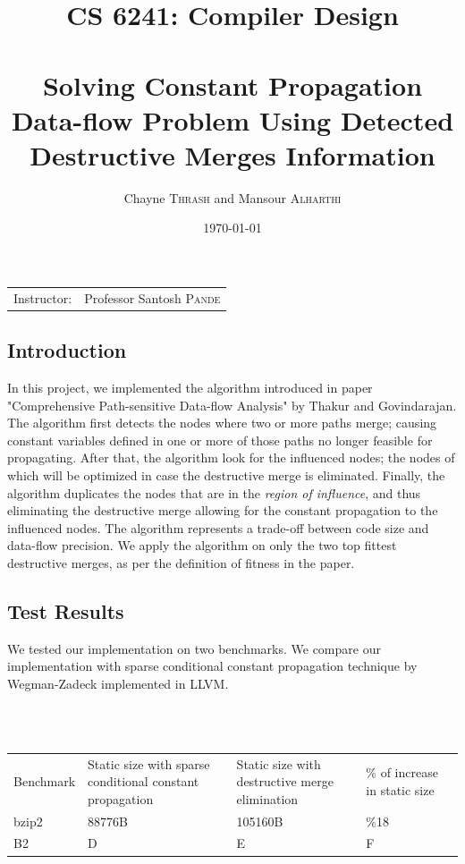\documentclass{article}
\title{CS 6241: Compiler Design \\~\\ Solving Constant Propagation Data-flow Problem Using Detected Destructive Merges Information} %
\author{Chayne \textsc{Thrash} and Mansour \textsc{Alharthi}} %
\date{\today} %
\begin{document}
\maketitle %

\begin{center}
\begin{tabular}{l r}
Instructor: & Professor Santosh \textsc{Pande} %
\end{tabular}
\end{center}

\subsection{Introduction}
In this project, we implemented the algorithm introduced in paper "Comprehensive Path-sensitive Data-flow Analysis" by Thakur and Govindarajan. The algorithm first detects the nodes where two or more paths merge; causing constant variables defined in one or more of those paths no longer feasible for propagating. After that, the algorithm look for the influenced nodes; the nodes of which will be optimized in case the destructive merge is eliminated. Finally, the algorithm duplicates the nodes that are in the \textit{region of influence}, and thus eliminating the destructive merge allowing for the constant propagation to the influenced nodes. The algorithm represents a trade-off between code size and data-flow precision. We apply the algorithm on only the two top fittest destructive merges, as per the definition of fitness in the paper. 

\subsection{Test Results}
We tested our implementation on two benchmarks. We compare our implementation with sparse conditional constant propagation technique by Wegman-Zadeck implemented in LLVM. 

~\\~

\begin{adjustbox}{center}
\renewcommand{\arraystretch}{2}
\begin{tabular}{| C{3cm} | C{3cm} | C{3cm} | C{3cm} | C{3cm} |}
\hline
Benchmark & Static size with sparse conditional constant propagation & Static size with destructive merge elimination & \% of increase in static size \\  
bzip2 & 88776B & 105160B & \%18  \\ 
B2 & D & E & F  \\ 
\end{tabular}
\end{adjustbox}
\end{document}
